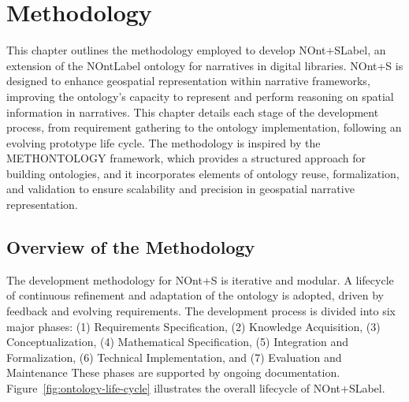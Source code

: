 \chapter{Methodology}\label{chap:methodology}

This chapter outlines the methodology employed to develop \acrshort{NOnt+SLabel}, an extension of the \acrshort{NOntLabel} ontology for narratives in digital libraries. NOnt+S is designed to enhance geospatial representation within narrative frameworks, improving the ontology’s capacity to represent and perform reasoning on spatial information in narratives. This chapter details each stage of the development process, from requirement gathering to the ontology implementation, following an evolving prototype life cycle. The methodology is inspired by the METHONTOLOGY framework\cite{fernandez-lopezMETHONTOLOGYOntologicalArt1997}, which provides a structured approach for building ontologies, and it incorporates elements of ontology reuse, formalization, and validation to ensure scalability and precision in geospatial narrative representation.

\section{Overview of the Methodology}\label{IV-sec:methodology-overview}

The development methodology for NOnt+S is iterative and modular. A lifecycle of continuous refinement and adaptation of the ontology is adopted, driven by feedback and evolving requirements. The development process is divided into six major phases: 
(1) Requirements Specification, 
(2) Knowledge Acquisition, 
(3) Conceptualization, 
(4) Mathematical Specification, 
(5) Integration and Formalization,  
(6) Technical Implementation, and
(7) Evaluation and Maintenance
These phases are supported by ongoing documentation. 
Figure~\ref{fig:ontology-life-cycle} illustrates the overall lifecycle of \acrshort{NOnt+SLabel}.

